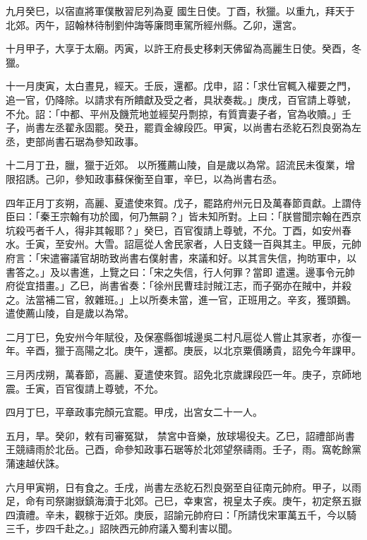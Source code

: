 \begin{pinyinscope}
 九月癸巳，以宿直將軍僕散習尼列為夏
 國生日使。丁酉，秋獵。以重九，拜天于北郊。丙午，詔翰林待制劉仲誨等廉問車駕所經州縣。乙卯，還宮。



 十月甲子，大享于太廟。丙寅，以許王府長史移剌天佛留為高麗生日使。癸酉，冬獵。



 十一月庚寅，太白晝見，經天。壬辰，還都。戊申，詔：「求仕官輒入權要之門，追一官，仍降除。以請求有所饋獻及受之者，具狀奏裁。」庚戌，百官請上尊號，不允。詔：「中都、平州及饑荒地並經契丹剽掠，有質賣妻子者，官為收贖。」壬子，尚書左丞翟永固罷。癸丑，罷貢金線段匹。甲寅，以尚書右丞紇石烈良弼為左丞，吏部尚書石琚為參知政事。



 十二月丁丑，臘，獵于近郊。
 以所獲薦山陵，自是歲以為常。詔流民未復業，增限招誘。己卯，參知政事蘇保衡至自軍，辛巳，以為尚書右丞。



 四年正月丁亥朔，高麗、夏遣使來賀。戊子，罷路府州元日及萬春節貢獻。上謂侍臣曰：「秦王宗翰有功於國，何乃無嗣？」皆未知所對。上曰：「朕嘗聞宗翰在西京坑殺丐者千人，得非其報耶？」癸巳，百官復請上尊號，不允。丁酉，如安州春水。壬寅，至安州。大雪。詔扈從人舍民家者，人日支錢一百與其主。甲辰，元帥府言：「宋遣審議官胡昉致尚書右僕射書，來議和好。以其言失信，拘昉軍中，以書答之。」及以書進，上覽之曰：「宋之失信，行人何罪？當即
 遣還。邊事令元帥府從宜措畫。」乙巳，尚書省奏：「徐州民曹珪討賊江志，而子弼亦在賊中，并殺之。法當補二官，敘雜班。」上以所奏未當，進一官，正班用之。辛亥，獲頭鵝。遣使薦山陵，自是歲以為常。



 二月丁巳，免安州今年賦役，及保塞縣御城邊吳二村凡扈從人嘗止其家者，亦復一年。辛酉，獵于高陽之北。庚午，還都。庚辰，以北京粟價踴貴，詔免今年課甲。



 三月丙戌朔，萬春節，高麗、夏遣使來賀。詔免北京歲課段匹一年。庚子，京師地震。壬寅，百官復請上尊號，不允。



 四月丁巳，平章政事完顏元宜罷。甲戌，出宮女二十一人。



 五月，旱。癸卯，敕有司審冤獄，
 禁宮中音樂，放球場役夫。乙巳，詔禮部尚書王競禱雨於北岳。己酉，命參知政事石琚等於北郊望祭禱雨。壬子，雨。窩乾餘黨蒲速越伏誅。



 六月甲寅朔，日有食之。壬戌，尚書左丞紇石烈良弼至自征南元帥府。甲子，以雨足，命有司祭謝嶽鎮海瀆于北郊。己巳，幸東宮，視皇太子疾。庚午，初定祭五嶽四瀆禮。辛未，觀稼于近郊。庚辰，詔諭元帥府曰：「所請伐宋軍萬五千，今以騎三千，步四千赴之。」詔陜西元帥府議入蜀利害以聞。




\end{pinyinscope}
